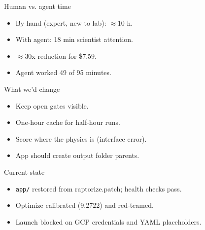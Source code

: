 \documentclass[10pt]{beamer}
\begin{document}
\begin{frame}{Human vs. agent time}
\begin{itemize}
\item By hand (expert, new to lab): $\approx$10 h.
\item With agent: 18 min scientist attention.
\item $\approx$30x reduction for \$7.59.
\item Agent worked 49 of 95 minutes.
\end{itemize}
\end{frame}

\begin{frame}{What we'd change}
\begin{itemize}
\item Keep open gates visible.
\item One-hour cache for half-hour runs.
\item Score where the physics is (interface error).
\item App should create output folder parents.
\end{itemize}
\end{frame}

\begin{frame}{Current state}
\begin{itemize}
\item \texttt{app/} restored from raptorize.patch; health checks pass.
\item Optimize calibrated (9.2722) and red-teamed.
\item Launch blocked on GCP credentials and YAML placeholders.
\end{itemize}
\end{frame}
\end{document}

